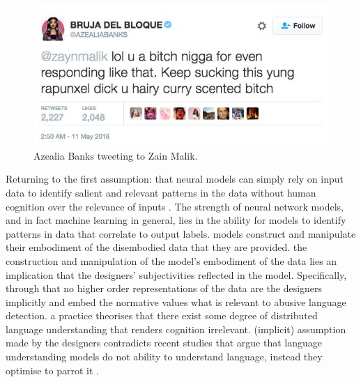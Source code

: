 \begin{figure}[h]
  \centering
  \includegraphics[scale=0.5]{Azealia_banks.jpeg}
  \caption{Azealia Banks tweeting to Zain Malik.}
  \label{fig:azealia_banks}
\end{figure}

Returning to the first assumption: that neural models can simply rely on input data to identify salient and relevant patterns in the data without human cognition over the relevance of inputs .
The strength of neural network models, and in fact machine learning in general, lies in the ability for models to identify patterns in data that correlate to output labels.
 models construct and manipulate their embodiment of the disembodied data that they are provided.
 the construction and manipulation of the model's embodiment of the data lies an implication that the designers' subjectivities  reflected in the model.
Specifically, through  that no higher order representations of the data are 
 the designers implicitly  and embed the normative values  what is relevant to abusive language detection.
 a practice  theorises that there exist some degree of distributed language understanding that renders  cognition irrelevant.
 (implicit) assumption made by the designers contradicts recent studies that argue that language understanding models do not  ability to understand language, instead they optimise to parrot it \citep{Bender-Koller:2020}.

